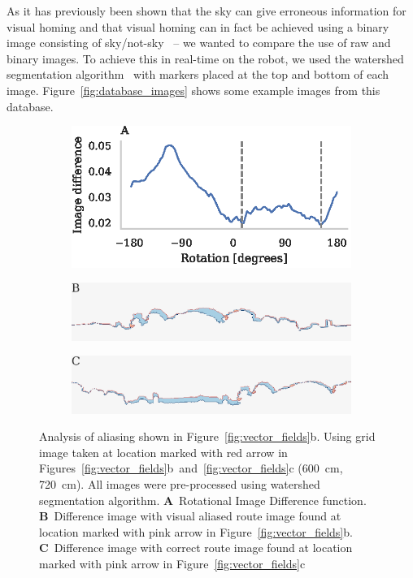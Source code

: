 \documentclass[letterpaper]{article}
\begin{document}
As it has previously been shown that the sky can give erroneous information for visual homing and that visual homing can in fact be achieved using a binary image consisting of sky/not-sky~\citep{Philippides2011,Stone2014} -- we wanted to compare the use of raw and binary images.
To achieve this in real-time on the robot, we used the watershed segmentation algorithm~\citep{Beucher1979} with markers placed at the top and bottom of each image.
Figure~\ref{fig:database_images} shows some example images from this database.

\begin{figure}[t]
    \begin{subfigure}[b]{\columnwidth}
        \includegraphics[width=\columnwidth]{figures/alias_ridf.eps}
    \end{subfigure}
    \begin{subfigure}[b]{\columnwidth}
        \includegraphics[width=\columnwidth]{figures/image_diff_bad.png}
    \end{subfigure}
    \begin{subfigure}[b]{\columnwidth}
        \includegraphics[width=\columnwidth]{figures/image_diff_good.png}
    \end{subfigure}
    \caption{Analysis of aliasing shown in Figure~\ref{fig:vector_fields}b.
    Using grid image taken at location marked with red arrow in Figures~\ref{fig:vector_fields}b~and~\ref{fig:vector_fields}c (\SI{600}{\centi\metre}, \SI{720}{\centi\metre}).
    All images were pre-processed using watershed segmentation algorithm.
    \textbf{A}~Rotational Image Difference function.
    \textbf{B}~Difference image with visual aliased route image found at location marked with pink arrow in Figure~\ref{fig:vector_fields}b.
    \textbf{C}~Difference image with correct route image found at location marked with pink arrow in Figure~\ref{fig:vector_fields}c}
    \label{fig:aliasing}
\end{figure}
\end{document}
